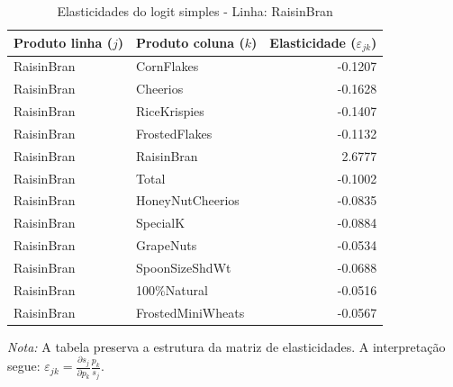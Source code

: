 \begingroup
\begin{table}[H]
\centering
\caption{Elasticidades do logit simples - Linha: RaisinBran}
\label{tab:elas-raisinbran}
\small
\begin{tabular}{llr}
\toprule
Produto linha ($j$) & Produto coluna ($k$) & Elasticidade ($\varepsilon_{jk}$) \\
\midrule
RaisinBran & CornFlakes & -0.1207 \\
RaisinBran & Cheerios & -0.1628 \\
RaisinBran & RiceKrispies & -0.1407 \\
RaisinBran & FrostedFlakes & -0.1132 \\
RaisinBran & RaisinBran & 2.6777 \\
RaisinBran & Total & -0.1002 \\
RaisinBran & HoneyNutCheerios & -0.0835 \\
RaisinBran & SpecialK & -0.0884 \\
RaisinBran & GrapeNuts & -0.0534 \\
RaisinBran & SpoonSizeShdWt & -0.0688 \\
RaisinBran & 100\%Natural & -0.0516 \\
RaisinBran & FrostedMiniWheats & -0.0567 \\
\bottomrule
\end{tabular}

\vspace{0.3em}
\footnotesize
\textit{Nota:} A tabela preserva a estrutura da matriz de elasticidades. A interpretação segue: $\varepsilon_{jk}=\frac{\partial s_j}{\partial p_k}\frac{p_k}{s_j}$.
\end{table}
\endgroup


